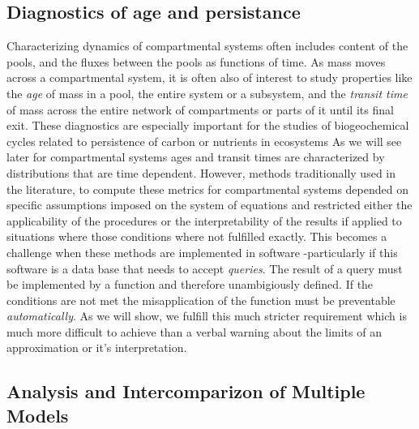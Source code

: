\subsection{Diagnostics of age and persistance} 
Characterizing dynamics of compartmental systems often includes content of the pools,
and the fluxes between the pools as functions of time.
As mass moves across a compartmental system, it is often also of interest to study
properties like the \emph{age} of mass in a pool, the entire system
or a subsystem, and the \emph{transit time} of mass 
across the entire network of compartments or parts of it until its
final exit. These diagnostics are especially important for the studies of biogeochemical cycles 
related to persistence of carbon or nutrients in ecosystems \cite{schmidt_persistence_2011, friedlingstein_uncertainties_2014, woolf_microbial_2019, kyker-snowman_stoichiometrically_2020}
As we will see later for compartmental systems ages and transit times are characterized by
distributions that are time dependent. 
However, methods traditionally used in the literature, to compute these metrics for
compartmental systems depended on specific assumptions imposed on the system
of equations \cite{Sierra2017GCB} and restricted either the applicability 
of the procedures or the interpretability of the results if applied to situations 
where those conditions where not fulfilled exactly. 
This becomes a challenge when these methods are implemented in software
-particularly if this software is a data base that needs to accept \emph{queries}. The result of a query must be implemented by a function and therefore unambigiously defined. If the conditions are not met the misapplication of the function must be preventable \emph{automatically}.
As we will show, we fulfill this much stricter requirement which is much more difficult to achieve than a verbal warning about the limits of an approximation or it's interpretation.


\subsection{Analysis and Intercomparizon of Multiple Models}

